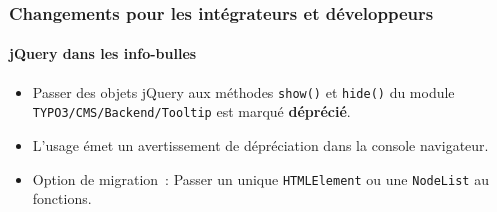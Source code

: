 %

\begin{frame}[fragile]
	\frametitle{Changements pour les intégrateurs et développeurs}
	\framesubtitle{jQuery dans les info-bulles}


	\begin{itemize}
		\item Passer des objets jQuery aux méthodes \texttt{show()} et \texttt{hide()}
			du module \texttt{TYPO3/CMS/Backend/Tooltip} est marqué
			\textbf{déprécié}.
		\item L'usage émet un avertissement de dépréciation dans la console navigateur.
		\item Option de migration~:
			Passer un unique \texttt{HTMLElement} ou une \texttt{NodeList} au fonctions.
	\end{itemize}

\end{frame}

